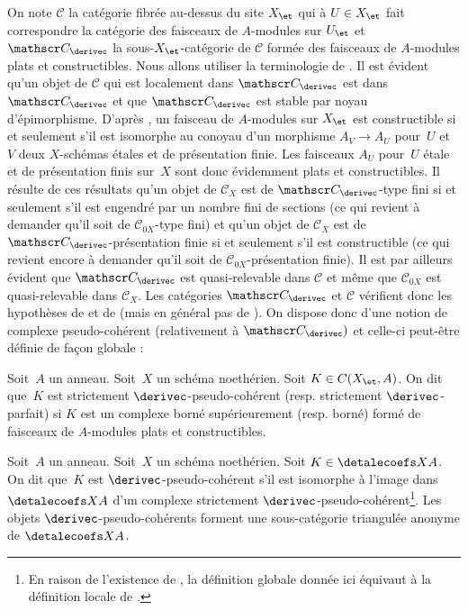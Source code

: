 \documentclass[10pt]{../fichiers-configuration-latex/smfart}
\begin{document}
On note $\mathscr C$ la catégorie fibrée au-dessus du site $X_\et$ qui à
$U\in X_\et$ fait correspondre la catégorie des faisceaux de $A$-modules
sur $U_\et$ et $\mathscr C_\derivec$ la sous-$X_\et$-catégorie de $\mathscr C$
formée des faisceaux de $A$-modules plats et constructibles. Nous allons
utiliser la terminologie de .
Il est évident qu'un objet de $\mathscr C$ qui est localement dans
$\mathscr C_\derivec$ est dans $\mathscr C_\derivec$ et que $\mathscr C_\derivec$ est stable par
noyau d'épimorphisme.
D'après , un faisceau de $A$-modules sur $X_\et$ est
constructible si et seulement s'il est isomorphe au conoyau d'un morphisme
$A_V\to A_U$ pour $U$ et $V$ deux $X$-schémas étales et de présentation
finie. Les faisceaux $A_U$ pour $U$ étale et de présentation finis
sur $X$ sont donc évidemment plats et constructibles.
Il résulte de ces résultats qu'un objet de $\mathscr C_X$ est de
$\mathscr C_\derivec$-type fini si et seulement s'il est engendré par un nombre
fini de sections (ce qui revient à demander qu'il soit de $\mathscr
C_{0X}$-type fini) et qu'un objet de $\mathscr C_X$ est de $\mathscr
C_\derivec$-présentation finie si et seulement s'il est constructible (ce qui
revient encore à demander qu'il soit de $\mathscr C_{0X}$-présentation
finie). Il est par ailleurs évident que $\mathscr C_\derivec$ est quasi-relevable
dans $\mathscr C$ et même que $\mathscr C_{0X}$ est quasi-relevable dans
$\mathscr C_X$. Les catégories $\mathscr C_\derivec$ et $\mathscr C$ vérifient
donc les hypothèses de  et de  (mais en général
pas de ). On dispose donc d'une notion de complexe
pseudo-cohérent (relativement à $\mathscr C_\derivec)$ et celle-ci peut-être
définie de façon globale :

\begin{definition2}
Soit $A$ un anneau. Soit $X$ un schéma noethérien.
Soit $K\in C(X_\et,A)$. On dit que $K$ est strictement
$\derivec$-pseudo-cohérent
(resp. strictement $\derivec$-parfait) si
$K$ est un complexe borné supérieurement (resp. borné)
formé de faisceaux de $A$-modules plats et constructibles.
\end{definition2}

\begin{definition2}
Soit $A$ un anneau. Soit $X$ un schéma noethérien.
Soit $K\in \detalecoefs X A$. On dit que $K$ est
$\derivec$-pseudo-cohérent s'il est
isomorphe à l'image dans $\detalecoefs X A$ d'un complexe strictement
$\derivec$-pseudo-cohérent\;\footnote{En raison de l'existence de
, la définition globale donnée ici
équivaut à la définition locale de .}.
Les objets $\derivec$-pseudo-cohérents forment une
sous-catégorie triangulée anonyme de $\detalecoefs X A$.
\end{definition2}
\end{document}
